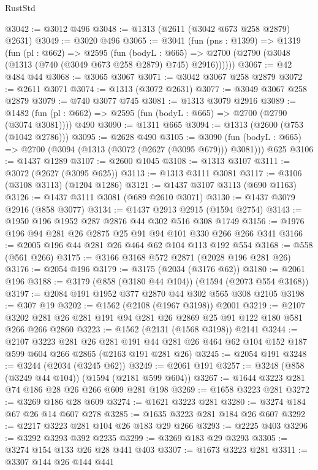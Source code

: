 \begin{lexlean}{RustStd}
\begin{coremodule}
@3042 := @3012 @496
@3048 := @1313 (@2611 (@3042 @673 @258 @2879) @2631)
@3049 := @3020 @496
@3065 := @3041
    (fun (pns : @1399) =>
    @1319
      (fun (pl : @662) =>
      @2595
        (fun (bodyL : @665) =>
        @2700 (@2790 (@3048 (@1313 (@740 (@3049 @673 @258 @2879) @745) @2916))))))
@3067 := @42 @484 @44
@3068 := @3065 @3067
@3071 := @3042 @3067 @258 @2879
@3072 := @2611 @3071
@3074 := @1313 (@3072 @2631)
@3077 := @3049 @3067 @258 @2879
@3079 := @740 @3077 @745
@3081 := @1313 @3079 @2916
@3089 := @1482 (fun (pl : @662) => @2595 (fun (bodyL : @665) => @2700 (@2790 (@3074 @3081)))) @490
@3090 := @1311 @665
@3094 := @1313 (@2600 (@753 (@1042 @2786)))
@3095 := @2628 @490
@3105 := @3090 (fun (bodyL : @665) => @2700 (@3094 (@1313 (@3072 (@2627 (@3095 @679))) @3081))) @625
@3106 := @1437 @1289
@3107 := @2600 @1045
@3108 := @1313 @3107
@3111 := @3072 (@2627 (@3095 @625))
@3113 := @1313 @3111 @3081
@3117 := @3106 (@3108 @3113) (@1204 @1286)
@3121 := @1437 @3107 @3113 (@690 @1163)
@3126 := @1437 @3111 @3081 (@689 @2610 @3071)
@3130 := @1437 @3079 @2916 (@858 @3077)
@3134 := @1437 @2913 @2915 (@1594 @2754)
@3143 := @1950 @196 @1952 @287 @2876 @44 @302 @516 @308 @1749
@3156 := @1976 @196 @94 @281 @26 @2875 @25 @91 @94 @101 @330 @266 @266 @341
@3166 := @2005 @196 @44 @281 @26 @464 @62 @104 @113 @192 @554
@3168 := @558 (@561 @266)
@3175 := @3166 @3168 @572 @2871 (@2028 @196 @281 @26)
@3176 := @2054 @196
@3179 := @3175 (@2034 (@3176 @62))
@3180 := @2061 @196
@3188 := @3179 (@858 (@3180 @44 @104)) (@1594 (@2073 @554 @3168))
@3197 := @2084 @191 @1952 @377 @2870 @44 @302 @565 @308 @2105
@3198 := @307 @19
@3202 := @1562 (@2108 (@1967 @3198)) @2001
@3219 := @2107 @3202 @281 @26 @281 @191 @94 @281 @26 @2869 @25 @91 @122 @180 @581 @266 @266 @2860
@3223 := @1562 (@2131 (@1568 @3198)) @2141
@3244 := @2107
    @3223
    @281
    @26
    @281
    @191
    @44
    @281
    @26
    @464
    @62
    @104
    @152
    @187
    @599
    @604
    @266
    @2865
    (@2163 @191 @281 @26)
@3245 := @2054 @191
@3248 := @3244 (@2034 (@3245 @62))
@3249 := @2061 @191
@3257 := @3248 (@858 (@3249 @44 @104)) (@1594 (@2181 @599 @604))
@3267 := @1644 @3223 @281 @74 @186 @28 @26 @266 @609 @281 @198
@3269 := @1658 @3223 @281
@3272 := @3269 @186 @28 @609
@3274 := @1621 @3223 @281
@3280 := @3274 @184 @67 @26 @14 @607 @278
@3285 := @1635 @3223 @281 @184 @26 @607
@3292 := @2217 @3223 @281 @104 @26 @183 @29 @266
@3293 := @2225 @403
@3296 := @3292 @3293 @392 @2235
@3299 := @3269 @183 @29 @3293
@3305 := @3274 @154 @133 @26 @28 @441 @403
@3307 := @1673 @3223 @281
@3311 := @3307 @144 @26 @144 @441

\end{coremodule}
\end{lexlean}
